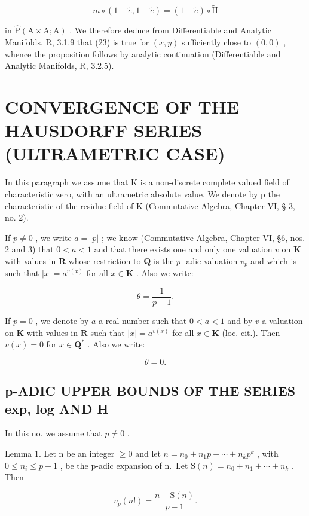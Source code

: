 \[
m \circ (1 + \tilde {e}, 1 + \tilde {e}) = (1 + \tilde {e}) \circ \tilde {\mathrm{H}}
\]

in \(\hat{\mathrm{P}} (\mathrm{A}\times \mathrm{A};\mathrm{A})\) . We therefore deduce from Differentiable and Analytic Manifolds, R, 3.1.9 that (23) is true for \((x,y)\) sufficiently close to \((0,0)\) , whence the proposition follows by analytic continuation (Differentiable and Analytic Manifolds, R, 3.2.5).

\section{CONVERGENCE OF THE HAUSDORFF SERIES (ULTRAMETRIC CASE)}

In this paragraph we assume that K is a non-discrete complete valued field of characteristic zero, with an ultrametric absolute value. We denote by p the characteristic of the residue field of K (Commutative Algebra, Chapter VI, § 3, no. 2).

If \(p \neq 0\) , we write \(a = |p|\) ; we know (Commutative Algebra, Chapter VI, §6, nos. 2 and 3) that \(0 < a < 1\) and that there exists one and only one valuation \(v\) on \(\mathbf{K}\) with values in \(\mathbf{R}\) whose restriction to \(\mathbf{Q}\) is the \(p\) -adic valuation \(v_p\) and which is such that \(|x| = a^{v(x)}\) for all \(x \in \mathbf{K}\) . Also we write:

\[
\theta = \frac {1}{p - 1}.\tag{1}
\]

If \(p = 0\) , we denote by \(a\) a real number such that \(0 < a < 1\) and by \(v\) a valuation on \(\mathbf{K}\) with values in \(\mathbf{R}\) such that \(|x| = a^{v(x)}\) for all \(x \in \mathbf{K}\) (loc. cit.). Then \(v(x) = 0\) for \(x \in \mathbf{Q}^*\) . Also we write:

\[
\theta = 0.\tag{2}
\]

\subsection{p-ADIC UPPER BOUNDS OF THE SERIES exp, log AND H}

In this no. we assume that \(p \neq 0\) .

Lemma 1. Let n be an integer \(\geqslant0\) and let \(n=n_{0}+n_{1}p+\cdots+n_{k}p^{k}\) , with \(0\leqslant n_{i}\leqslant p-1\) , be the p-adic expansion of n.~Let \(\mathrm{S}(n)=n_{0}+n_{1}+\cdots+n_{k}\) . Then

\[
v _ {p} (n!) = \frac {n - \mathrm{S} (n)}{p - 1}.\tag{3}
\]


